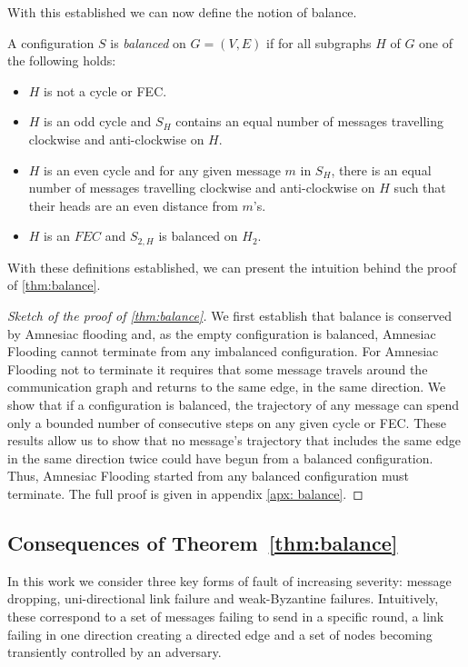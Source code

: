     With this established we can now define the notion of balance.
    \begin{definition}
    \label{def: balance}
        A configuration $S$ is \emph{balanced} on $G=(V,E)$ if for all subgraphs $H$ of $G$ one of the following holds:
        \begin{itemize}
            \item $H$ is not a cycle or FEC.
            \item $H$ is an odd cycle and $S_H$ contains an equal number of messages travelling clockwise and anti-clockwise on $H$.
            \item $H$ is an even cycle and for any given message $m$ in $S_H$, there is an equal number of messages travelling clockwise and anti-clockwise on $H$ such that their heads are an even distance from $m$'s.
            \item $H$ is an $FEC$ and $S_{2,H}$ is balanced on $H_2$.
        \end{itemize}
    \end{definition}
    With these definitions established, we can present the intuition behind the proof of \cref{thm:balance}.
    \begin{proof}[Sketch of the proof of \cref{thm:balance}]
    We first establish that balance is conserved by Amnesiac flooding and, as the empty configuration is balanced, Amnesiac Flooding cannot terminate from any imbalanced configuration.
    For Amnesiac Flooding not to terminate it requires that some message travels around the communication graph and returns to the same edge, in the same direction. We show that if a configuration is balanced, the trajectory of any message can spend only a bounded number of consecutive steps on any given cycle or FEC. These results allow us to show that no message's trajectory that includes the same edge in the same direction twice could have begun from a balanced configuration. Thus, Amnesiac Flooding started from any balanced configuration must terminate.
    The full proof is given in appendix \ref{apx: balance}.
    \end{proof}
    \subsection{Consequences of Theorem~\ref{thm:balance}}
    \label{sec:faults}
    In this work we consider three key forms of fault of increasing severity: message dropping, uni-directional link failure and weak-Byzantine failures. Intuitively, these correspond to a set of messages failing to send in a specific round, a link failing in one direction creating a directed edge and a set of nodes becoming transiently controlled by an adversary.


